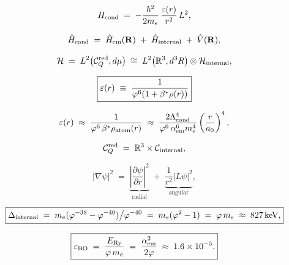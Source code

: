 \begin{equation}
  H_{\mathrm{cond}}
  \;=\; -\frac{\hbar^2}{2m_e}
        \,\frac{\varepsilon(r)}{r^2}\,L^2,
  \label{P13:eq:H_cond}
\end{equation}

\begin{equation}
  \hat{H}_{\rm cond}
  \;=\; \hat{H}_{\rm cm}(\mathbf{R})
  \;+\; \hat{H}_{\rm internal}
  \;+\; \hat{V}(\mathbf{R}),
  \label{P13:eq:H_decomp}
\end{equation}

\begin{equation}
  \mathcal{H}
  \;=\; L^2\!\left(\mathcal{C}_Q^{\rm red},d\mu\right)
  \;\cong\;
  L^2\!\left(\mathbb{R}^3,d^3R\right)\otimes\mathcal{H}_{\rm internal},
  \label{P13:eq:Hilbert_factorisation}
\end{equation}

\begin{equation}
  \boxed{\varepsilon(r)
  \;\equiv\; \frac{1}{\varphi^6(1+\beta^{*}\rho(r))}}
  \label{P13:eq:epsilon_def}
\end{equation}

\begin{equation}
  \varepsilon(r)
  \;\approx\; \frac{1}{\varphi^6\,\beta^{*}\rho_{\rm atom}(r)}
  \;\approx\; \frac{2\Lambda_{\mathrm{cond}}^4}{\varphi^6\,\alpha_{\mathrm{em}}^6 m_e^4}
        \left(\frac{r}{a_0}\right)^4,
  \label{P13:eq:eps_chameleon}
\end{equation}

\begin{equation}
  \mathcal{C}_Q^{\rm red} \;=\; \mathbb{R}^3 \times \mathcal{C}_{\rm internal},
  \label{P13:eq:fibration}
\end{equation}

\begin{equation}
  |\nabla\psi|^2
  \;=\; \underbrace{\left|\frac{\partial\psi}{\partial r}\right|^2}_{\text{radial}}
  \;+\; \underbrace{\frac{1}{r^2}|L\psi|^2}_{\text{angular}},
  \label{P13:eq:gradient_decomp}
\end{equation}

\begin{equation}
  \boxed{\Delta_{\rm internal}
  \;=\; m_e(\varphi^{-38}-\varphi^{-40})\big/\varphi^{-40}
  \;=\; m_e(\varphi^2-1)
  \;=\; \varphi\, m_e
  \;\approx\; 827\,\mathrm{keV},}
  \label{P13:eq:internal_gap}
\end{equation}

\begin{equation}
  \boxed{\varepsilon_{\rm BO}
  \;=\; \frac{E_{\mathrm{Ry}}}{\varphi\, m_e}
  \;=\; \frac{\alpha_{\mathrm{em}}^2}{2\varphi}
  \;\approx\; 1.6\times10^{-5}.}
  \label{P13:eq:eps_BO}
\end{equation}

